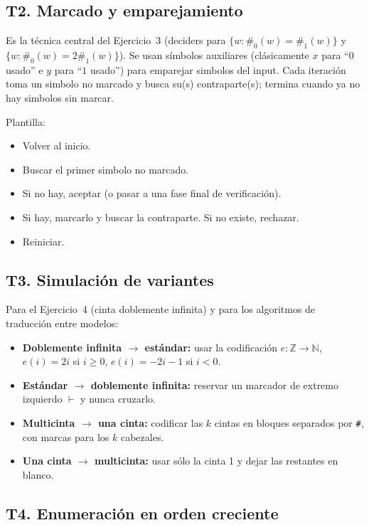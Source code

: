 \documentclass[11pt,a4paper]{article}
\theoremstyle{plain}
\theoremstyle{definition}
\theoremstyle{remark}
\begin{document}
\subsection*{T2. Marcado y emparejamiento}

Es la t\'ecnica central del Ejercicio~3 (deciders para
$\{w:\#_0(w)=\#_1(w)\}$ y $\{w:\#_0(w)=2\#_1(w)\}$). Se usan s\'imbolos
auxiliares (cl\'asicamente $x$ para ``$0$ usado'' e $y$ para ``$1$ usado'')
para emparejar simbolos del input. Cada iteraci\'on toma un simbolo no
marcado y busca su(s) contraparte(s); termina cuando ya no hay simbolos
sin marcar.

Plantilla:
\begin{itemize}
  \item Volver al inicio.
  \item Buscar el primer simbolo no marcado.
  \item Si no hay, aceptar (o pasar a una fase final de verificaci\'on).
  \item Si hay, marcarlo y buscar la contraparte. Si no existe, rechazar.
  \item Reiniciar.
\end{itemize}

\subsection*{T3. Simulaci\'on de variantes}

Para el Ejercicio~4 (cinta doblemente infinita) y para los algoritmos de
traducci\'on entre modelos:

\begin{itemize}
  \item \textbf{Doblemente infinita $\to$ est\'andar:} usar la codificaci\'on
        $e:\mathbb Z\to\mathbb N$, $e(i)=2i$ si $i\ge 0$, $e(i)=-2i-1$ si
        $i<0$.
  \item \textbf{Est\'andar $\to$ doblemente infinita:} reservar un marcador
        de extremo izquierdo $\vdash$ y nunca cruzarlo.
  \item \textbf{Multicinta $\to$ una cinta:} codificar las $k$ cintas en
        bloques separados por \texttt{\#}, con marcas para los $k$
        cabezales.
  \item \textbf{Una cinta $\to$ multicinta:} usar s\'olo la cinta 1 y dejar
        las restantes en blanco.
\end{itemize}

\subsection*{T4. Enumeraci\'on en orden creciente}
\end{document}
